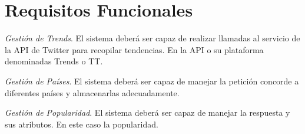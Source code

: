\section{Requisitos Funcionales}

\begin{enumerate}
    { \renewcommand\labelenumi{R.F. \theenumi}
    \item
    \textit{Gestión de Trends}. El sistema deberá ser capaz de realizar llamadas al servicio de la API de Twitter para recopilar tendencias. En la API o su plataforma denominadas Trends o \ac{TT}.
        \begin{enumerate}{\renewcommand{\labelenumii}{R.F. \arabic{enumi}.\arabic{enumii}}
        \item
        \textit{Gestión de Países}. El sistema deberá ser capaz de manejar la petición concorde a diferentes países y almacenarlas adecuadamente.
        \item
        \textit{Gestión de Popularidad}. El sistema deberá ser capaz de manejar la respuesta y sus atributos. En este caso la popularidad.
        }\end{enumerate}
    \item
}\end{enumerate}
